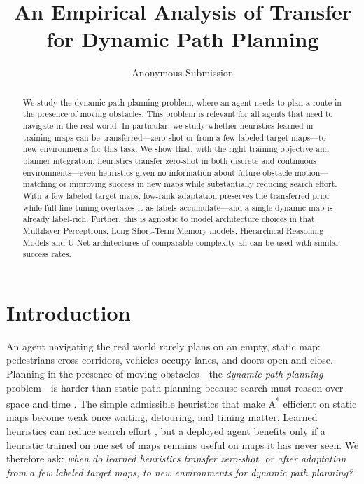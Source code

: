 \documentclass[letterpaper]{article} %
\title{An Empirical Analysis of Transfer for Dynamic Path Planning}
\author{
    Anonymous Submission
}
\begin{document}
\maketitle

\begin{abstract}
We study the dynamic path planning problem, where an agent needs to plan a route in the presence of moving obstacles. This problem is relevant for all agents that need to navigate in the real world. In particular, we study whether heuristics learned in training maps can be transferred---zero-shot or from a few labeled target maps---to new environments for this task. We show that, with the right training objective and planner integration, heuristics transfer zero-shot in both discrete and continuous environments---even heuristics given no information about future obstacle motion---matching or improving success in new maps while substantially reducing search effort. With a few labeled target maps, low-rank adaptation preserves the transferred prior while full fine-tuning overtakes it as labels accumulate---and a single dynamic map is already label-rich. Further, this is agnostic to model architecture choices in that Multilayer Perceptrons, Long Short-Term Memory models, Hierarchical Reasoning Models and U-Net architectures of comparable complexity all can be used with similar success rates.
\end{abstract}


\section{Introduction}

An agent navigating the real world rarely plans on an empty, static map: pedestrians cross corridors, vehicles occupy lanes, and doors open and close. Planning in the presence of moving obstacles---the \emph{dynamic path planning} problem---is harder than static path planning because search must reason over space and time \citep{silver2005cooperative,phillips2011sipp}. The simple admissible heuristics that make A\textsuperscript{*} \citep{hart1968astar} efficient on static maps become weak once waiting, detouring, and timing matter. Learned heuristics can reduce search effort \citep{arfaee2011bootstrap,bhardwaj2017sail,yonetani2021neuralastar}, but a deployed agent benefits only if a heuristic trained on one set of maps remains useful on maps it has never seen. We therefore ask: \emph{when do learned heuristics transfer zero-shot, or after adaptation from a few labeled target maps, to new environments for dynamic path planning?}
\end{document}
